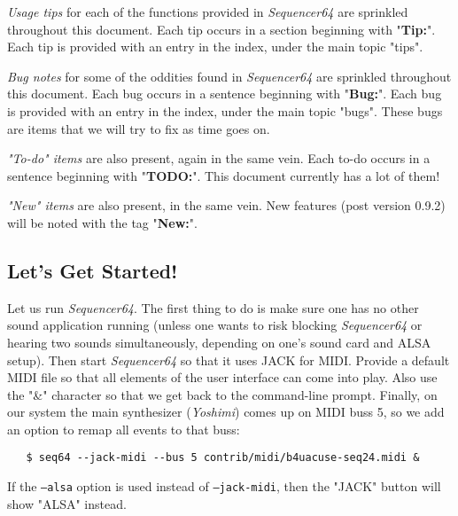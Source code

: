 \documentclass[
 11pt,
 twoside,
 a4paper,
 headinclude,
 footinclude,
 final                                 %
]{article}
\begin{document}
   \textsl{Usage tips}
   for each of the functions provided in
   \textsl{Sequencer64} are sprinkled throughout this document.
   Each tip occurs in a section beginning with "\textbf{Tip:}".
   Each tip is provided with an entry in the index, under the
   main topic "tips".

   \textsl{Bug notes}
   for some of the oddities found in \textsl{Sequencer64} are
   sprinkled throughout this document.
   Each bug occurs in a sentence beginning with "\textbf{Bug:}".
   Each bug is provided with an entry in the index, under the
   main topic "bugs".  These bugs are items that we will try to
   fix as time goes on.

   \textsl{"To-do" items}
   are also present, again in the same vein.
   Each to-do occurs in a sentence beginning with "\textbf{TODO:}".
   This document currently has a lot of them!

   \textsl{"New" items}
   are also present, in the same vein.
   New features (post version 0.9.2) will be noted with the tag
   "\textbf{New:}".

\subsection{Let's Get Started!}
\label{subsec:introduction_lets_get_started}

   Let us run \textsl{Sequencer64}.
   The first
   thing to do is make sure one has no other sound application running
   (unless one wants to risk blocking \textsl{Sequencer64} or hearing two
   sounds simultaneously, depending on one's sound card and ALSA setup).
   Then start \textsl{Sequencer64} so that it uses JACK for MIDI.  Provide a
   default MIDI file so that all elements of the user interface can come
   into play.  Also use the "\&" character so that we get back to the
   command-line prompt.  Finally, on our system the main synthesizer
   (\textsl{Yoshimi}) comes up on MIDI buss 5, so we add an option to remap
   all events to that buss:


\begin{verbatim}
   $ seq64 --jack-midi --bus 5 contrib/midi/b4uacuse-seq24.midi &
\end{verbatim}

   If the \texttt{--alsa} option is used instead of
   \texttt{--jack-midi}, then the "JACK" button will show "ALSA" instead.
\end{document}

